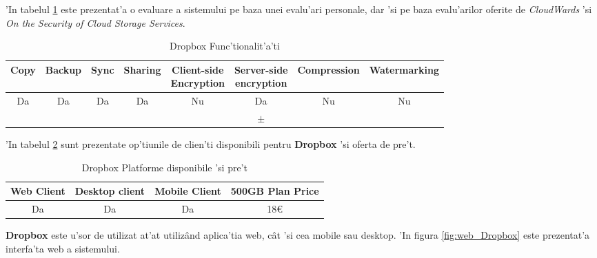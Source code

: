 \documentclass[12pt,a4paper,twoside]{report}
\newcommand{\greencheck}{\color{green}  \ding{51}}
\newcommand{\orangepm}{\color{orange} \textbf{$\pm$}}
\newcommand{\redxmark}{\color{red} \ding{55}}
\begin{document}
'In tabelul \ref{table:dropboxfeaturetable} este prezentat'a o evaluare a sistemului pe baza unei evalu'ari personale, dar 'si pe baza evalu'arilor oferite de \textit{CloudWards}\cite{cloudwards_best} 'si \textit{On the Security of Cloud Storage Services}\cite{cloudstoragecomparison}.
\begin{table}[H]
\small
\centering
\caption{Dropbox Func'tionalit'a'ti}
\begin{tabular}{|c|c|c|c|c|c|c|c|}          
\hline               
Copy & Backup & Sync & Sharing & \makecell{Client-side\\ Encryption} & \makecell{Server-side \\ encryption} & Compression & Watermarking \\ [0.5ex]   
\hline 
Da & Da & Da & Da & Nu &  Da  & Nu & Nu    \\                      
\greencheck & \greencheck & \greencheck & \greencheck\greencheck & \redxmark\redxmark & \orangepm &  \redxmark\redxmark &  \redxmark\redxmark  \\               
\hline                              
\end{tabular}
\label{table:dropboxfeaturetable}             
\end{table}
'In tabelul \ref{table:dropboxsystemtable} sunt prezentate op'tiunile de clien'ti disponibili pentru \textbf{Dropbox} 'si oferta de pre't.
\begin{table}[H]
\centering
\caption{Dropbox Platforme disponibile 'si pre't}
\begin{tabular}{|c|c|c|c|}          
\hline                      
 Web Client & Desktop client & Mobile Client & 500GB Plan Price\\ [0.5ex]   
\hline                            
Da & Da & Da & 18\euro \\               
\hline                              
\end{tabular}
\label{table:dropboxsystemtable}             
\end{table}
\textbf{Dropbox} este u'sor de utilizat at'at utilizând aplica'tia web, cât 'si cea mobile sau desktop. 'In figura \ref{fig:web_Dropbox} este prezentat'a interfa'ta web a sistemului.
\end{document}
